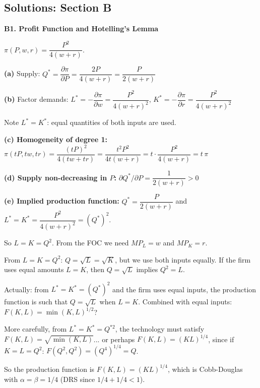 \documentclass[12pt, a4paper]{article}
\theoremstyle{definition}
\newcommand{\pp}[2]{\dfrac{\partial #1}{\partial #2}}
\begin{document}
\subsection{Solutions: Section B}

\begin{solbox}
\textbf{B1. Profit Function and Hotelling's Lemma}

$\pi(P,w,r) = \dfrac{P^2}{4(w+r)}$.

\textbf{(a)} Supply: $Q^* = \pp{\pi}{P} = \dfrac{2P}{4(w+r)} = \dfrac{P}{2(w+r)}$

\textbf{(b)} Factor demands:
$L^* = -\pp{\pi}{w} = \dfrac{P^2}{4(w+r)^2}$, \quad
$K^* = -\pp{\pi}{r} = \dfrac{P^2}{4(w+r)^2}$

Note $L^* = K^*$: equal quantities of both inputs are used.

\textbf{(c) Homogeneity of degree 1:}
$\pi(tP,tw,tr) = \dfrac{(tP)^2}{4(tw+tr)} = \dfrac{t^2P^2}{4t(w+r)} = t\cdot\dfrac{P^2}{4(w+r)} = t\,\pi$ \checkmark

\textbf{(d) Supply non-decreasing in $P$:}
$\partial Q^*/\partial P = \dfrac{1}{2(w+r)} > 0$ \checkmark

\textbf{(e) Implied production function:}
$Q^* = \dfrac{P}{2(w+r)}$ and $L^* = K^* = \dfrac{P^2}{4(w+r)^2} = (Q^*)^2$.

So $L = K = Q^2$. From the FOC we need $MP_L = w$ and $MP_K = r$.

From $L=K=Q^2$: $Q = \sqrt{L} = \sqrt{K}$, but we use both inputs equally.
If the firm uses equal amounts $L=K$, then $Q = \sqrt{L}$ implies $Q^2=L$.

Actually: from $L^*=K^*=(Q^*)^2$ and the firm uses equal inputs, the production function is such that $Q=\sqrt{L}$ when $L=K$. Combined with equal inputs: $F(K,L)=\min(K,L)^{1/2}$?

More carefully, from $L^*=K^*=Q^{*2}$, the technology must satisfy $F(K,L)=\sqrt{\min(K,L)}$... or perhaps $F(K,L)=(KL)^{1/4}$, since if $K=L=Q^2$: $F(Q^2,Q^2)=(Q^4)^{1/4}=Q$. \checkmark

So the production function is $F(K,L) = (KL)^{1/4}$, which is Cobb-Douglas with $\alpha=\beta=1/4$ (DRS since $1/4+1/4<1$).
\end{solbox}
\end{document}
